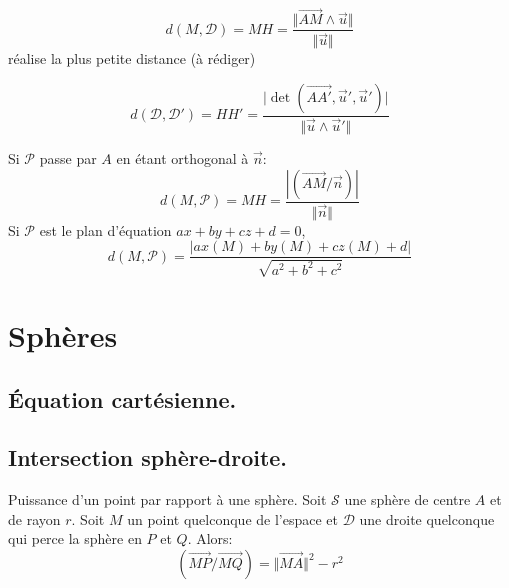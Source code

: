 \begin{prop}
 \begin{displaymath}
  d(M,\mathcal D) = MH = \frac{\Vert\overrightarrow{AM}\wedge \overrightarrow u \Vert}{\Vert \overrightarrow u\Vert}
 \end{displaymath}
réalise la plus petite distance (à rédiger)
\end{prop}
\begin{demo}

\end{demo}

\begin{prop}
 \begin{displaymath}
  d(\mathcal D,\mathcal D') = HH' 
= \frac{\vert \det(\overrightarrow{AA'}, \overrightarrow u', \overrightarrow u')\vert}
       {\Vert \overrightarrow u \wedge \overrightarrow u'\Vert}
 \end{displaymath}
\end{prop}
\begin{demo}
 
\end{demo}

\begin{prop}
Si $\mathcal P$ passe par $A$ en étant orthogonal à $\overrightarrow n$:
 \begin{displaymath}
  d(M,\mathcal P)= MH = \frac{|(\overrightarrow{AM}/\overrightarrow n)|}{\Vert \overrightarrow n \Vert}
 \end{displaymath}
Si $\mathcal{P}$ est le plan d'équation $ax+by+cz+d=0$,
\begin{displaymath}
 d(M,\mathcal P)= \frac{|ax(M)+by(M)+cz(M)+d|}{\sqrt{a^2+b^2+c^2}}
\end{displaymath}

\end{prop}
\section{Sphères}
\subsection{\'Equation cartésienne.}
\subsection{Intersection sphère-droite.}
\begin{exple}
Puissance d'un point par rapport à une sphère.
Soit $\mathcal S$ une sphère de centre $A$ et de rayon $r$. Soit $M$ un point quelconque de l'espace et $\mathcal D$ une droite quelconque qui perce la sphère en $P$ et $Q$. Alors:
\begin{displaymath}
 (\overrightarrow{MP}/\overrightarrow{MQ}) = \Vert\overrightarrow{MA}\Vert^2 - r^2
\end{displaymath}
\end{exple}

